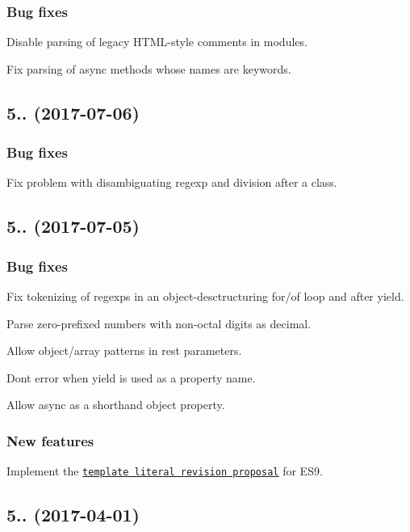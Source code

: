 \subsubsection*{Bug fixes}

Disable parsing of legacy H\+T\+M\+L-\/style comments in modules.

Fix parsing of async methods whose names are keywords.

\subsection*{5.. (2017-\/07-\/06)}

\subsubsection*{Bug fixes}

Fix problem with disambiguating regexp and division after a class.

\subsection*{5.. (2017-\/07-\/05)}

\subsubsection*{Bug fixes}

Fix tokenizing of regexps in an object-\/desctructuring {\ttfamily for}/{\ttfamily of} loop and after {\ttfamily yield}.

Parse zero-\/prefixed numbers with non-\/octal digits as decimal.

Allow object/array patterns in rest parameters.

Don\textquotesingle{}t error when {\ttfamily yield} is used as a property name.

Allow {\ttfamily async} as a shorthand object property.

\subsubsection*{New features}

Implement the \href{https://github.com/tc39/proposal-template-literal-revision}{\tt template literal revision proposal} for E\+S9.

\subsection*{5.. (2017-\/04-\/01)}

